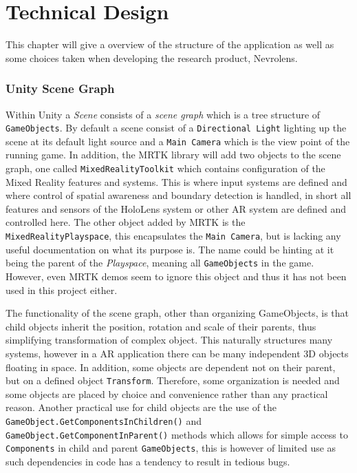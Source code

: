 \chapter{Technical Design}

This chapter will give a overview of the structure of the application as well as some choices taken when developing the research product, Nevrolens. 

\subsection*{Unity Scene Graph}

Within Unity a \textit{Scene} consists of a \textit{scene graph} which is a tree structure of \texttt{GameObjects}. By default a scene consist of a \texttt{Directional Light} lighting up the scene at its default light source and a \texttt{Main Camera} which is the view point of the running game. In addition, the MRTK library will add two objects to the scene graph, one called \texttt{MixedRealityToolkit} which contains configuration of the Mixed Reality features and systems. This is where input systems are defined and where control of spatial awareness and boundary detection is handled, in short all features and sensors of the HoloLens system or other AR system are defined and controlled here. The other object added by MRTK is the \texttt{MixedRealityPlayspace}, this encapsulates the \texttt{Main Camera}, but is lacking any useful documentation on what its purpose is. The name could be hinting at it being the parent of the \textit{Playspace}, meaning all \texttt{GameObjects} in the game. However, even MRTK demos seem to ignore this object and thus it has not been used in this project either.

The functionality of the scene graph, other than organizing GameObjects, is that child objects inherit the position, rotation and scale of their parents, thus simplifying transformation of complex object. This naturally structures many systems, however in a AR application there can be many independent 3D objects floating in space. In addition, some objects are dependent not on their parent, but on a defined object \texttt{Transform}. Therefore, some organization is needed and some objects are placed by choice and convenience rather than any practical reason. Another practical use for child objects are the use of the \texttt{GameObject.GetComponentsInChildren()} and \texttt{GameObject.GetComponentInParent()} methods which allows for simple access to \texttt{Components} in child and parent \texttt{GameObjects}, this is however of limited use as such dependencies in code has a tendency to result in tedious bugs.

